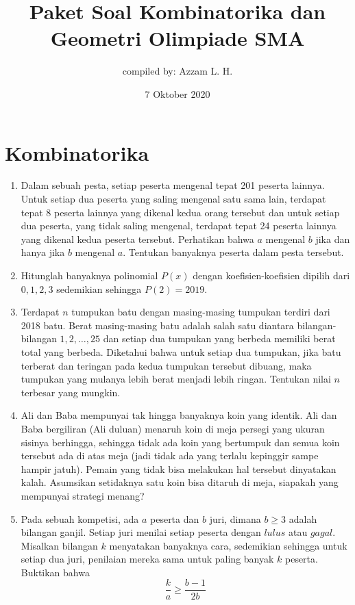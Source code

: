 \documentclass[12pt]{article}
\title{Paket Soal Kombinatorika dan Geometri Olimpiade SMA}
\author{compiled by: Azzam L. H.}
\date{7 Oktober 2020}
\begin{document}
	\maketitle
	
\section{Kombinatorika}
\begin{enumerate}
	\item
	Dalam sebuah pesta, setiap peserta mengenal tepat 201 peserta lainnya. Untuk setiap dua peserta yang saling mengenal satu sama lain, terdapat tepat 8 peserta lainnya yang dikenal kedua orang tersebut dan untuk setiap dua peserta, yang tidak saling mengenal, terdapat tepat 24 peserta lainnya yang dikenal kedua peserta tersebut. Perhatikan
	bahwa $a$ mengenal $b$ jika dan hanya jika $b$ mengenal $a$. Tentukan banyaknya peserta dalam pesta tersebut.
	
	\item
	Hitunglah banyaknya polinomial $P(x)$ dengan koefisien-koefisien dipilih dari ${0,1,2,3}$ sedemikian sehingga $P(2)=2019$.
	
	\item
	Terdapat $n$ tumpukan batu dengan masing-masing tumpukan terdiri dari 2018 batu. Berat masing-masing batu adalah salah satu diantara bilangan-bilangan $1,2,\dots,25$ dan setiap dua tumpukan yang berbeda memiliki berat total yang berbeda. Diketahui bahwa untuk setiap dua tumpukan, jika batu terberat dan teringan  pada kedua tumpukan tersebut dibuang, maka tumpukan yang mulanya lebih berat menjadi lebih ringan. Tentukan nilai $n$ terbesar yang mungkin. 
	
	\item
	Ali dan Baba mempunyai tak hingga banyaknya koin yang identik. Ali dan Baba bergiliran (Ali duluan) menaruh koin di meja persegi yang ukuran sisinya berhingga, sehingga tidak ada koin yang bertumpuk dan semua koin tersebut ada di atas meja (jadi tidak ada yang terlalu kepinggir sampe hampir jatuh). Pemain yang tidak bisa melakukan hal tersebut dinyatakan kalah. Asumsikan setidaknya satu koin bisa ditaruh di meja, siapakah yang mempunyai strategi menang?
	
	\item
	Pada sebuah kompetisi, ada $a$ peserta dan $b$ juri, dimana $b \geq 3$ adalah bilangan ganjil. Setiap juri menilai setiap peserta dengan $\textit{lulus}$ atau $\textit{gagal}$. Misalkan bilangan $k$ menyatakan banyaknya cara, sedemikian sehingga untuk setiap dua juri, penilaian mereka sama untuk paling banyak $k$ peserta. Buktikan bahwa \[ \dfrac{k}{a} \geq \dfrac{b-1}{2b} \]
	

\end{enumerate}
\end{document}
